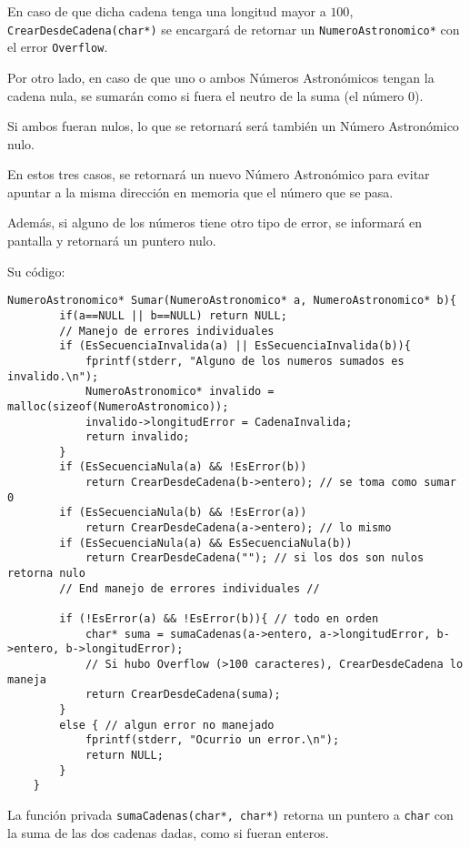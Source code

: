 \documentclass[a4paper, 12pt]{article}
\begin{document}
En caso de que dicha cadena tenga una longitud mayor a $100$, \verb|CrearDesdeCadena(char*)| se encargará de retornar un \verb|NumeroAstronomico*| con el error \verb|Overflow|.

Por otro lado, en caso de que uno o ambos Números Astronómicos tengan la cadena nula, se sumarán como si fuera el neutro de la suma (el número $0$).

Si ambos fueran nulos, lo que se retornará será también un Número Astronómico nulo.

En estos tres casos, se retornará un nuevo Número Astronómico para evitar apuntar a la misma dirección en memoria que el número que se pasa.

Además, si alguno de los números tiene otro tipo de error, se informará en pantalla y retornará un puntero nulo.

Su código:

\begin{lstlisting}[style=C]
    NumeroAstronomico* Sumar(NumeroAstronomico* a, NumeroAstronomico* b){
        if(a==NULL || b==NULL) return NULL;
        // Manejo de errores individuales
        if (EsSecuenciaInvalida(a) || EsSecuenciaInvalida(b)){
            fprintf(stderr, "Alguno de los numeros sumados es invalido.\n");
            NumeroAstronomico* invalido = malloc(sizeof(NumeroAstronomico));
            invalido->longitudError = CadenaInvalida;
            return invalido;
        }
        if (EsSecuenciaNula(a) && !EsError(b))
            return CrearDesdeCadena(b->entero); // se toma como sumar 0
        if (EsSecuenciaNula(b) && !EsError(a))
            return CrearDesdeCadena(a->entero); // lo mismo
        if (EsSecuenciaNula(a) && EsSecuenciaNula(b))
            return CrearDesdeCadena(""); // si los dos son nulos retorna nulo
        // End manejo de errores individuales //
    
        if (!EsError(a) && !EsError(b)){ // todo en orden
            char* suma = sumaCadenas(a->entero, a->longitudError, b->entero, b->longitudError);
            // Si hubo Overflow (>100 caracteres), CrearDesdeCadena lo maneja
            return CrearDesdeCadena(suma);
        }
        else { // algun error no manejado
            fprintf(stderr, "Ocurrio un error.\n");
            return NULL;
        }
    }
\end{lstlisting}

La función privada \verb|sumaCadenas(char*, char*)| retorna un puntero a \verb|char| con la suma de las dos cadenas dadas, como si fueran enteros.
\end{document}
